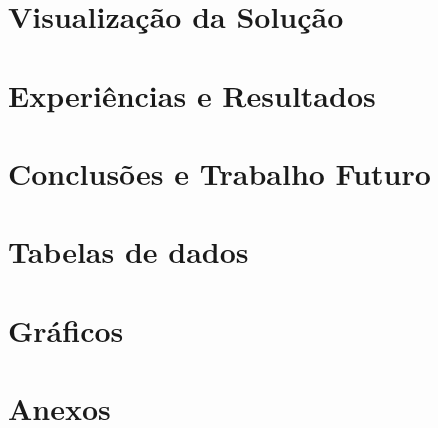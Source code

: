 \documentclass[runningheads]{llncs}
\begin{document}
\section{Visualização da Solução}


\section{Experiências e Resultados}


\section{Conclusões e Trabalho Futuro}


\clearpage
\appendix
\section{Tabelas de dados}

\clearpage
\section{Gráficos}

\clearpage
\section{Anexos}

\end{document}
